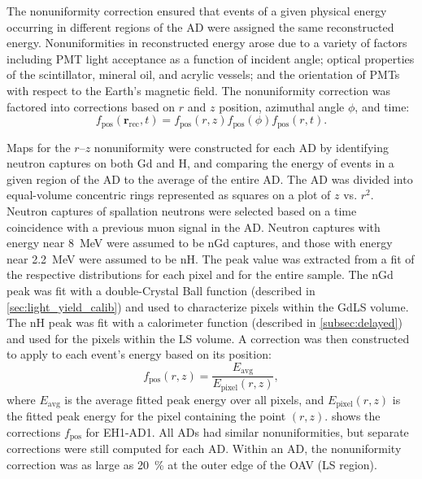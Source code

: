 The nonuniformity correction ensured that events of a given physical energy
occurring in different regions of the AD
were assigned the same reconstructed energy.
Nonuniformities in reconstructed energy arose due to a variety of factors
including PMT light acceptance as a function of incident angle;
optical properties of the scintillator, mineral oil, and acrylic vessels;
and the orientation of PMTs with respect to the Earth's magnetic field.
The nonuniformity correction was factored into corrections based on
$r$ and $z$ position, azimuthal angle $\phi$, and time:
\begin{equation}
    f_{\text{pos}}(\textbf{r}_{\text{rec}},t) =
    f_{\text{pos}}(r, z)f_{\text{pos}}(\phi)f_{\text{pos}}(r, t).
\end{equation}

Maps for the $r$--$z$ nonuniformity were constructed for each AD
by identifying neutron captures on both Gd and H,
and comparing the energy of events in a given region of the AD
to the average of the entire AD.
The AD was divided into equal-volume concentric rings
represented as squares on a plot of $z$ vs. $r^2$.
Neutron captures of spallation neutrons were selected
based on a time coincidence with a previous muon signal in the AD.
Neutron captures with energy near \SI{8}{\MeV} were assumed to be nGd captures,
and those with energy near \SI{2.2}{\MeV} were assumed to be nH.
The peak value was extracted from a fit of the respective distributions
for each pixel and for the entire sample.
The nGd peak was fit with a double-Crystal Ball function \cite{cbfunction}
(described in \cref{sec:light_yield_calib})
and used to characterize pixels within the GdLS volume.
The nH peak was fit with a calorimeter function \cite{calorimeter2016}
(described in \cref{subsec:delayed})
and used for the pixels within the LS volume.
A correction was then constructed to apply to each event's energy based on its position:
\begin{equation}
    f_{\text{pos}}(r, z) = \frac{E_{\text{avg}}}{E_{\text{pixel}}(r,z)},
\end{equation}
where $E_\text{avg}$ is the average fitted peak energy over all pixels,
and $E_\text{pixel}(r, z)$ is the fitted peak energy for the pixel
containing the point $(r, z)$.
 shows the corrections $f_{\text{pos}}$ for EH1-AD1.
All ADs had similar nonuniformities, but separate corrections were still computed
for each AD.
Within an AD, the nonuniformity correction was as large as \SI{20}{\percent}
at the outer edge of the OAV (LS region).

